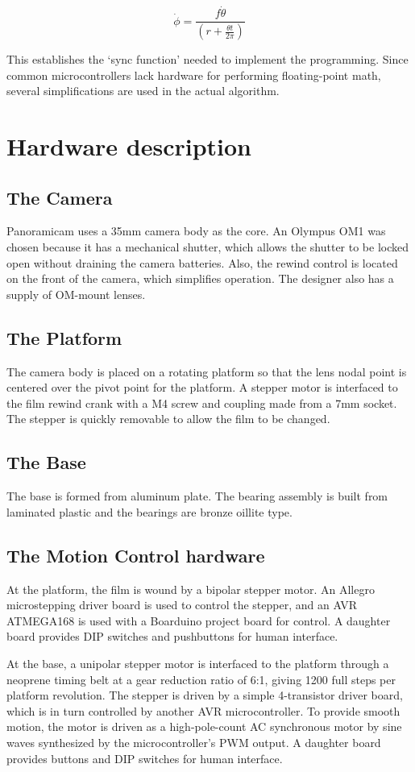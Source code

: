 \documentclass[dvips,12pt]{article}
\begin{document}
\begin{displaymath}
\dot{\phi} = \frac{f\dot{\theta}}{\left(r+\frac{\theta t}{2 \pi}\right)}
\end{displaymath}

This establishes the `sync function' needed to implement the programming. Since common microcontrollers lack hardware for performing floating-point math, several simplifications are used in the actual algorithm. 

\section{Hardware description}
\subsection{The Camera}
Panoramicam uses a 35mm camera body as the core. An Olympus OM1 was chosen because it has a mechanical shutter, which allows the shutter to be locked open without draining the camera batteries. Also, the rewind control is located on the front of the camera, which simplifies operation. The designer also has a supply of OM-mount lenses. 
\subsection{The Platform}
The camera body is placed on a rotating platform so that the lens nodal point is centered over the pivot point for the platform. A stepper motor is interfaced to the film rewind crank with a M4 screw and coupling made from a 7mm socket. The stepper is quickly removable to allow the film to be changed. 
\subsection{The Base}
The base is formed from aluminum plate. The bearing assembly is built from laminated plastic and the bearings are bronze oillite type. 
\subsection{The Motion Control hardware}
At the platform, the film is wound by a bipolar stepper motor. An Allegro microstepping driver board is used to control the stepper, and an AVR ATMEGA168 is used with a Boarduino project board for control. A daughter board provides DIP switches and pushbuttons for human interface.

At the base, a unipolar stepper motor is interfaced to the platform through a neoprene timing belt at a gear reduction ratio of 6:1, giving 1200 full steps per platform revolution. The stepper is driven by a simple 4-transistor driver board, which is in turn controlled by another AVR microcontroller. To provide smooth motion, the motor is driven as a high-pole-count AC synchronous motor by sine waves synthesized by the microcontroller's PWM output. A daughter board provides buttons and DIP switches for human interface.
\end{document}
